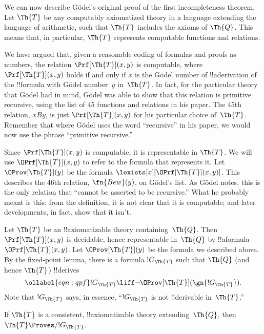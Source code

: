 \documentclass[../../../include/open-logic-section]{subfiles}
\begin{document}


We can now describe G\"odel's original proof of the first
incompleteness theorem. Let $\Th{T}$ be any computably axiomatized theory
in a language extending the language of arithmetic, such that $\Th{T}$
includes the axioms of $\Th{Q}$. This means that, in particular, $\Th{T}$
represents computable functions and relations.

We have argued that, given a reasonable coding of formulas and proofs
as numbers, the relation $\Prf[\Th{T}](x,y)$ is computable, where
$\Prf[\Th{T}](x,y)$ holds if and only if $x$ is the G\"odel number of
!!a{derivation} of the !!{formula} with G\"odel number~$y$
in~$\Th{T}$. In fact, for the particular theory that G\"odel had in
mind, G\"odel was able to show that this relation is primitive
recursive, using the list of 45 functions and relations in his
paper. The 45th relation, $x B y$, is just $\Prf[\Th{T}](x,y)$ for his
particular choice of~$\Th{T}$. Remember that where G\"odel uses the
word ``recursive'' in his paper, we would now use the phrase
``primitive recursive.''

Since $\Prf[\Th{T}](x,y)$ is computable, it is representable in $\Th{T}$. We
will use $\OPrf[\Th{T}](x,y)$ to refer to the formula that represents
it. Let $\OProv[\Th{T}](y)$ be the formula
$\lexists[x][\OPrf[\Th{T}](x,y)]$. This describes the 46th relation,
$\fn{Bew}(y)$, on G\"odel's list. As G\"odel notes, this is the only
relation that ``cannot be asserted to be recursive.''  What he
probably meant is this: from the definition, it is not clear that it
is computable; and later developments, in fact, show that it isn't.

Let $\Th{T}$ be an !!{axiomatizable} theory containing~$\Th{Q}$. Then
$\Prf[\Th{T}](x, y)$ is decidable, hence representable in~$\Th{Q}$ by
!!a{formula}~$\OPrf[\Th{T}](x, y)$. Let $\OProv[\Th{T}](y)$ be the formula we
described above. By the fixed-point lemma, there is a formula
$!G_\Th{T}$ such that $\Th{Q}$ (and hence $\Th{T}$) !!{derive}s
\begin{equation}
\ollabel{eqn:qpf}
!G_\Th{T} \liff \lnot \OProv[\Th{T}](\gn{!G_\Th{T}}).
\end{equation}
Note that $!G_\Th{T}$ says, in essence, ``$!G_\Th{T}$ is not
!!{derivable} in~$\Th{T}$.''

\begin{lem}
If $\Th{T}$ is a consistent, !!{axiomatizable} theory
extending~$\Th{Q}$, then $\Th{T} \Proves/ !G_\Th{T}$.
\end{lem}
\end{document}
